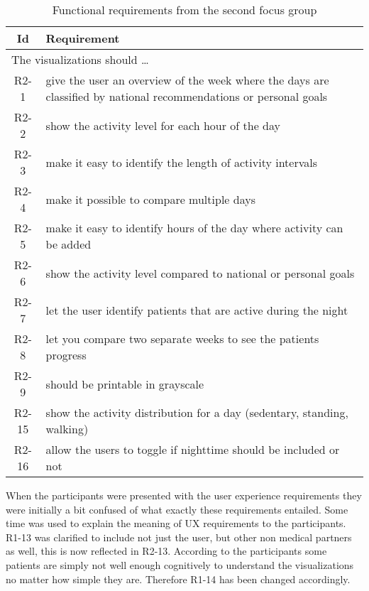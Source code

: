 \begin{table}[h!]
  \begin{center}
  \begin{tabular}{|c|p{12cm}|}
    \hline
      \textbf{Id} & \textbf{Requirement} \\ \hline
    \multicolumn{2}{|l|}{The visualizations should \ldots} \\ \hline
      R2-1 & give the user an overview of the week where the days are classified by national recommendations or personal goals \\ \hline
      R2-2 & show the activity level for each hour of the day \\ \hline
      R2-3 & make it easy to identify the length of activity intervals \\ \hline
      R2-4 & make it possible to compare multiple days \\ \hline
      R2-5 & make it easy to identify hours of the day where activity can be added \\ \hline
      R2-6 & show the activity level compared to national or personal goals \\ \hline
      R2-7 & let the user identify patients that are active during the night \\ \hline
      R2-8 & let you compare two separate weeks to see the patients progress \\ \hline
      R2-9 & should be printable in grayscale \\ \hline
      R2-15 & show the activity distribution for a day (sedentary, standing, walking) \\ \hline
      R2-16 & allow the users to toggle if nighttime should be included or not \\ \hline
  \end{tabular}
  \end{center}
  \caption{Functional requirements from the second focus group}
\end{table}

When the participants were presented with the user experience requirements they were initially a bit confused of what exactly these requirements entailed. Some time was used to explain the meaning of UX requirements to the participants. R1-13 was clarified to include not just the user, but other non medical partners as well, this is now reflected in R2-13. According to the participants some patients are simply not well enough cognitively to understand the visualizations no matter how simple they are. Therefore R1-14 has been changed accordingly.

